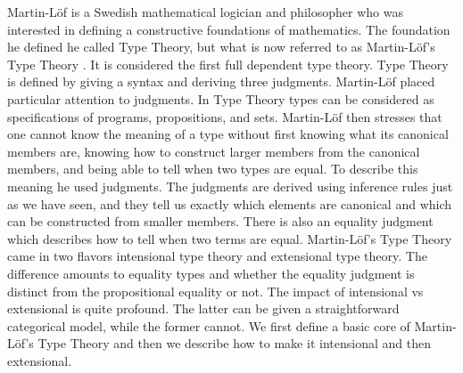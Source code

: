Martin-L\"of is a Swedish mathematical logician and philosopher who
was interested in defining a constructive foundations of mathematics.
The foundation he defined he called Type Theory, but what is now
referred to as Martin-L\"of's Type Theory
\cite{Martin:1982,Martin:1984}.  It is considered the first full
dependent type theory.  Type Theory is defined by giving a syntax and
deriving three judgments.  Martin-L\"of placed particular attention
to judgments.  In Type Theory types can be considered as
specifications of programs, propositions, and sets.  Martin-L\"of then
stresses that one cannot know the meaning of a type without first
knowing what its canonical members are, knowing how to construct
larger members from the canonical members, and being able to tell when
two types are equal.  To describe this meaning he used judgments.  The
judgments are derived using inference rules just as we have seen, and
they tell us exactly which elements are canonical and which can be
constructed from smaller members.  There is also an equality judgment
which describes how to tell when two terms are equal.  Martin-L\"of's
Type Theory came in two flavors intensional type theory and
extensional type theory.  The difference amounts to equality types and
whether the equality judgment is distinct from the propositional
equality or not.  The impact of intensional vs extensional is quite
profound.  The latter can be given a straightforward categorical
model, while the former cannot.  We first define a basic core of
Martin-L\"of's Type Theory and then we describe how to make it
intensional and then extensional.

